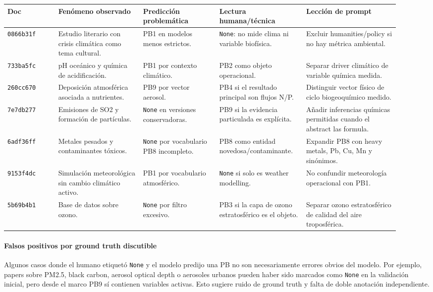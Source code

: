 \begin{center}
\scriptsize
\setlength{\tabcolsep}{3pt}
\renewcommand{\arraystretch}{1.15}
\begin{tabular}{p{0.12\linewidth}p{0.20\linewidth}p{0.18\linewidth}p{0.20\linewidth}p{0.22\linewidth}}
\toprule
Doc & Fenómeno observado & Predicción problemática & Lectura humana/técnica & Lección de prompt \\
\midrule
\texttt{0866b31f} & Estudio literario con crisis climática como tema cultural. & PB1 en modelos menos estrictos. & \texttt{None}: no mide clima ni variable biofísica. & Excluir humanities/policy si no hay métrica ambiental. \\
\texttt{733ba5fc} & pH oceánico y química de acidificación. & PB1 por contexto climático. & PB2 como objeto operacional. & Separar driver climático de variable química medida. \\
\texttt{260cc670} & Deposición atmosférica asociada a nutrientes. & PB9 por vector aerosol. & PB4 si el resultado principal son flujos N/P. & Distinguir vector físico de ciclo biogeoquímico medido. \\
\texttt{7e7db277} & Emisiones de SO2 y formación de partículas. & \texttt{None} en versiones conservadoras. & PB9 si la evidencia particulada es explícita. & Añadir inferencias químicas permitidas cuando el abstract las formula. \\
\texttt{6adf36ff} & Metales pesados y contaminantes tóxicos. & \texttt{None} por vocabulario PB8 incompleto. & PB8 como entidad novedosa/contaminante. & Expandir PB8 con heavy metals, Pb, Cu, Mn y sinónimos. \\
\texttt{9153f4dc} & Simulación meteorológica sin cambio climático activo. & PB1 por vocabulario atmosférico. & \texttt{None} si solo es weather modelling. & No confundir meteorología operacional con PB1. \\
\texttt{5b69b4b1} & Base de datos sobre ozono. & \texttt{None} por filtro excesivo. & PB3 si la capa de ozono estratosférico es el objeto. & Separar ozono estratosférico de calidad del aire troposférica. \\
\bottomrule
\end{tabular}
\end{center}

\paragraph*{Falsos positivos por ground truth discutible}

Algunos casos donde el humano etiquetó \texttt{None} y el modelo predijo una PB no son necesariamente errores obvios del modelo. Por ejemplo, papers sobre PM2.5, black carbon, aerosol optical depth o aerosoles urbanos pueden haber sido marcados como \texttt{None} en la validación inicial, pero desde el marco PB9 sí contienen variables activas. Esto sugiere ruido de ground truth y falta de doble anotación independiente.

